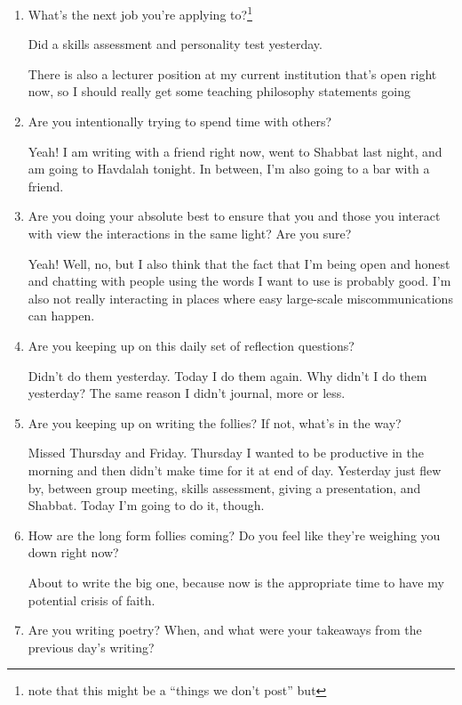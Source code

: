 \documentclass[12pt]{article}
\newcommand{\say}[1]{``#1''}
\renewcommand{\,}{\textsuperscript{,}}
\begin{document}
\begin{enumerate}
\item What's the next job you're applying to?\footnote{note that this might be a \say{things we don't post} but}

Did a skills assessment and personality test yesterday.

There is also a lecturer position at my current institution that's open right now, so I should really get some teaching philosophy statements going

\item Are you intentionally trying to spend time with others?

Yeah! I am writing with a friend right now, went to Shabbat last night, and am going to Havdalah tonight. In between, I'm also going to a bar with a friend.

\item Are you doing your absolute best to ensure that you and those you interact with view the interactions in the same light? Are you sure?

Yeah! Well, no, but I also think that the fact that I'm being open and honest and chatting with people using the words I want to use is probably good. I'm also not really interacting in places where easy large-scale miscommunications can happen.

\item Are you keeping up on this daily set of reflection questions?

Didn't do them yesterday. Today I do them again. Why didn't I do them yesterday? The same reason I didn't journal, more or less.

\item Are you keeping up on writing the follies? If not, what's in the way?

Missed Thursday and Friday. Thursday I wanted to be productive in the morning and then didn't make time for it at end of day.  
Yesterday just flew by, between group meeting, skills assessment, giving a presentation, and Shabbat.  
Today I'm going to do it, though.

\item How are the long form follies coming? Do you feel like they're weighing you down right now?

About to write the big one, because now is the appropriate time to have my potential crisis of faith.

\item Are you writing poetry? When, and what were your takeaways from the previous day's writing?


\end{enumerate}
\end{document}
